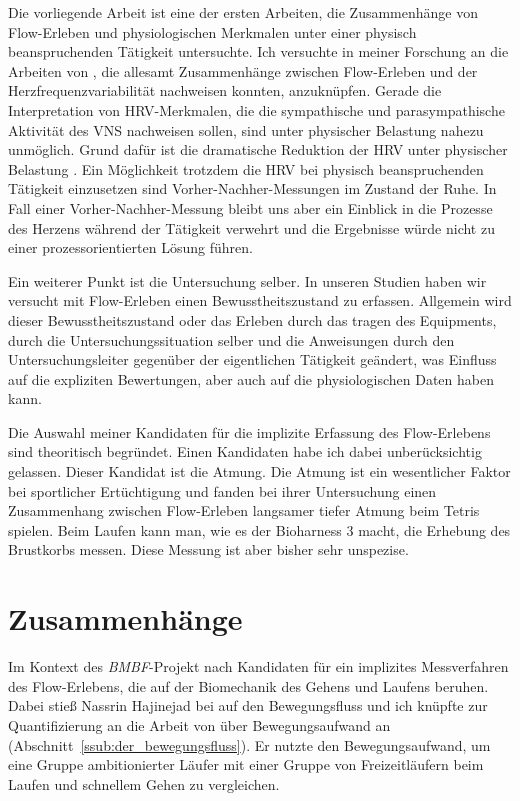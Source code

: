 Die vorliegende Arbeit ist eine der ersten Arbeiten, die Zusammenhänge von Flow-Erleben und physiologischen Merkmalen unter einer physisch beanspruchenden Tätigkeit untersuchte. Ich versuchte in meiner Forschung an die Arbeiten von \citet{deManzano2010, Keller2011, Gaggioli2013, Peifer2014, Tozman2015}, die allesamt Zusammenhänge zwischen Flow-Erleben und der Herzfrequenzvariabilität nachweisen konnten, anzuknüpfen. Gerade die Interpretation von HRV-Merkmalen, die die sympathische und parasympathische Aktivität des \ac{VNS} nachweisen sollen, sind unter physischer Belastung nahezu unmöglich. Grund dafür ist die dramatische Reduktion der \ac{HRV} unter physischer Belastung \citep[][]{Hoos2010}. Ein Möglichkeit trotzdem die HRV bei physisch beanspruchenden Tätigkeit einzusetzen sind Vorher-Nachher-Messungen im Zustand der Ruhe. In Fall einer Vorher-Nachher-Messung bleibt uns aber ein Einblick in die Prozesse des Herzens während der Tätigkeit verwehrt und die Ergebnisse würde nicht zu einer prozessorientierten Lösung führen. 	
	
Ein weiterer Punkt ist die Untersuchung selber. In unseren Studien haben wir versucht mit Flow-Erleben einen Bewusstheitszustand zu erfassen. Allgemein wird dieser Bewusstheitszustand oder das Erleben durch das tragen des Equipments, durch die Untersuchungssituation selber und die  Anweisungen durch den Untersuchungsleiter gegenüber der eigentlichen Tätigkeit geändert, was Einfluss auf die expliziten Bewertungen, aber auch auf die physiologischen Daten haben kann.	%

Die Auswahl meiner Kandidaten für die implizite Erfassung des Flow-Erlebens sind theoritisch begründet. Einen Kandidaten habe ich dabei unberücksichtig gelassen. Dieser Kandidat ist die Atmung. Die Atmung ist ein wesentlicher Faktor bei sportlicher Ertüchtigung und \citet{Harmat2015} fanden bei ihrer Untersuchung einen Zusammenhang zwischen Flow-Erleben langsamer tiefer Atmung beim Tetris spielen. Beim Laufen kann man, wie es der Bioharness 3 macht, die Erhebung des Brustkorbs messen. Diese Messung ist aber bisher sehr unspezise. 


\section{Zusammenhänge} %
\label{sec:zusammenhange}

Im Kontext des \emph{BMBF}-Projekt nach Kandidaten für ein implizites Messverfahren des Flow-Erlebens, die auf der Biomechanik des Gehens und Laufens beruhen. Dabei stieß Nassrin Hajinejad bei \citet[][S.~121]{Meinel2007} auf den Bewegungsfluss und ich knüpfte zur Quantifizierung an die Arbeit von \citet{Hreljac2000} über Bewegungsaufwand an (Abschnitt~\ref{ssub:der_bewegungsfluss}). Er nutzte den Bewegungsaufwand, um eine Gruppe ambitionierter Läufer mit einer Gruppe von Freizeitläufern beim Laufen und schnellem Gehen zu vergleichen. 


